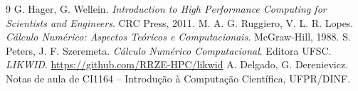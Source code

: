 \documentclass[10pt,a4paper]{article}
\begin{document}
\begin{thebibliography}{9}
 G. Hager, G. Wellein. \emph{Introduction to High Performance Computing for Scientists and Engineers}. CRC Press, 2011.
 M. A. G. Ruggiero, V. L. R. Lopes. \emph{Cálculo Numérico: Aspectos Teóricos e Computacionais}. McGraw-Hill, 1988.
 S. Peters, J. F. Szeremeta. \emph{Cálculo Numérico Computacional}. Editora UFSC.
 \emph{LIKWID}. \url{https://github.com/RRZE-HPC/likwid}
 A. Delgado, G. Derenievicz. Notas de aula de CI1164 -- Introdução à Computação Científica, UFPR/DINF.
\end{thebibliography}
\end{document}
